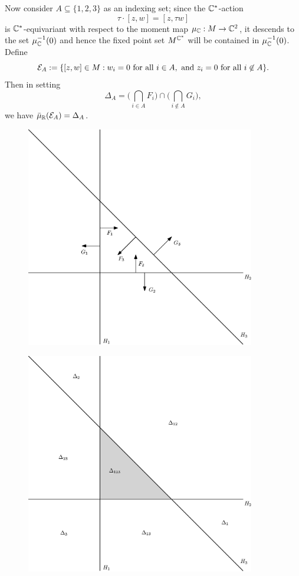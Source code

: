 Now consider $A \subseteq \{1,2,3 \}$ as an indexing set; since the $\mathbb{C}^{\ast}$-action
$$
	\tau \cdot [z,w] = [z,\tau w]
$$
is $\mathbb{C}^{\ast}$-equivariant with respect to the moment map $\mu_{\mathbb{C}}: M \rightarrow \mathbb{C}^{2}$, it descends to the set $\mu_{\mathbb{C}}^{-1}(0)$ and hence the fixed point set $M^{\mathbb{C}^{\ast}}$ will be contained in $\mu_{\mathbb{C}}^{-1}(0)$. Define
$$
	\mathcal{E}_{A} := \{ [z,w] \in M : w_{i} = 0 \text{ for all } i \in A, \text{ and } z_{i} = 0 \text{ for all } i \not\in A \}.
$$
Then in setting
$$
	\Delta_{A} = \bigg( \bigcap_{i\in A} F_{i}  \bigg) \cap \bigg( \bigcap_{i\not\in A} G_{i}\bigg),
$$
we have $\bar{\mu}_{\mathbb{R}}(\mathcal{E}_{A}) = \Delta_{A}$.

\begin{figure}[h]
	\centering
	\includegraphics[width=10cm]{extended-core.eps}
\end{figure}

\begin{figure}[h!]
	\centering
	\includegraphics[width=10cm]{extended-core-polyhedra.eps}
\end{figure}

